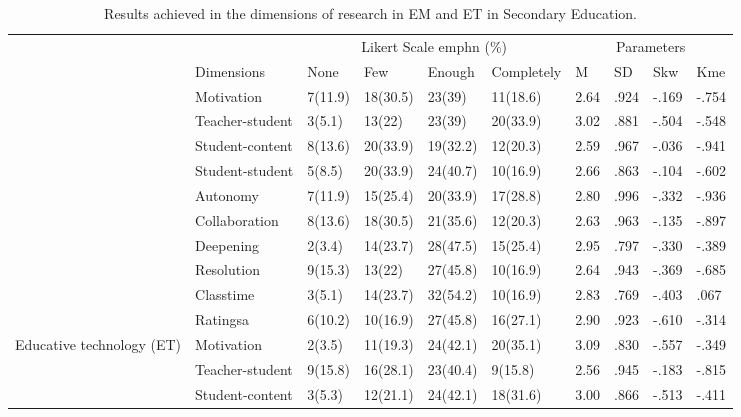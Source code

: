 \documentclass{textolivre}
\begin{document}
\begin{table}[htpb]
\caption{Results achieved in the dimensions of research in EM and ET in Secondary Education.}
\label{tab2}
\centering
\small
\begin{tabular}{p{}p{}p{}p{}p{}p{}p{}p{}p{}p{}}
\toprule 
& & \multicolumn{4}{c}{Likert Scale emph{n (\%)}} & \multicolumn{4}{c}{Parameters}
\\ 
& Dimensions & None & Few & Enough & Completely & M & SD & Skw & Kme
\\
\midrule
\arrayrulecolor[gray]{.7}
\multirow{10}{=}{Emerging methodology (EM)}	& Motivation & 7(11.9) & 18(30.5) & 23(39) & 11(18.6) & 2.64 & .924 & -.169 & -.754
\\
& Teacher-student	& 3(5.1) & 13(22) & 23(39) & 20(33.9) & 3.02 & .881 & -.504 & -.548
\\ 
& Student-content & 8(13.6) & 20(33.9) & 19(32.2) & 12(20.3) & 2.59 & .967 & -.036 & -.941
\\
& Student-student & 5(8.5) & 20(33.9) & 24(40.7) & 10(16.9) & 2.66 & .863 & -.104 & -.602
\\
& Autonomy & 7(11.9) & 15(25.4) & 20(33.9) & 17(28.8) &	2.80 & .996 & -.332 & -.936
\\
& Collaboration	& 8(13.6) & 18(30.5) & 21(35.6) & 12(20.3) & 2.63 & .963 & -.135 & -.897
\\
& Deepening	& 2(3.4) & 14(23.7) & 28(47.5) & 15(25.4) & 2.95 & .797 & -.330 & -.389
\\
& Resolution & 9(15.3) & 13(22) & 27(45.8) & 10(16.9) & 2.64 & .943 & -.369 & -.685
\\
& Classtime	& 3(5.1) & 14(23.7) & 32(54.2) & 10(16.9) &	2.83 & .769 & -.403 & .067
\\
& Ratingsa & 6(10.2) & 10(16.9) & 27(45.8) & 16(27.1) & 2.90 & .923 & -.610 & -.314
\\ 
\midrule
\multirow{10}{=}{Educative technology (ET)} & Motivation & 2(3.5) & 11(19.3) & 24(42.1) & 20(35.1) & 3.09 & .830 & -.557 & -.349
\\
& Teacher-student & 9(15.8) & 16(28.1) & 23(40.4) & 9(15.8) & 2.56 & .945 & -.183 & -.815
\\
& Student-content & 3(5.3) & 12(21.1) & 24(42.1) & 18(31.6) & 3.00 & .866 & -.513 & -.411

\end{tabular}
\end{table}
\end{document}

